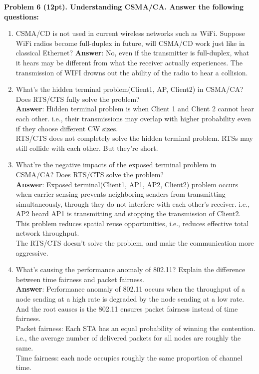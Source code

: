 \documentclass[12pt]{article}
\begin{document}
\noindent \textbf{Problem 6 (12pt). Understanding CSMA/CA. Answer the following questions:\\}
\begin{enumerate}
\item CSMA/CD is not used in current wireless networks such as WiFi. Suppose WiFi radios
become full-duplex in future, will CSMA/CD work just like in classical Ethernet?
\textbf{Answer}: No, even if the transmitter is full-duplex, what it hears may be different from what the receiver actually experiences. The transmission of WIFI drowns out the ability of the radio to hear a collision.

\item What’s the hidden terminal problem(Client1, AP, Client2) in CSMA/CA? Does RTS/CTS fully solve the problem?\\
\textbf{Answer}:  Hidden terminal problem is when Client 1 and Client 2 cannot hear each other. i.e., their transmissions may overlap with higher probability even if they choose different CW sizes.\\ RTS/CTS does not completely solve the hidden terminal problem. RTSs may still collide with each other. But they're short.

\item What’re the negative impacts of the exposed terminal problem in CSMA/CA? Does
RTS/CTS solve the problem?\\
\textbf{Answer}: Exposed terminal(Client1, AP1, AP2, Client2) problem occurs when carrier sensing prevents neighboring senders from transmitting simultaneously, through they do not interfere with each other's receiver. i.e., AP2 heard AP1 is transmitting and stopping the transmission of Client2. This problem reduces spatial reuse opportunities, i.e., reduces effective total network throughput.\\
The RTS/CTS doesn't solve the problem, and make the communication more aggressive.
\item What’s causing the performance anomaly of 802.11? Explain the difference between time
fairness and packet fairness.\\
\textbf{Answer}: Performance anomaly of 802.11 occurs when the throughput of a node sending at a high rate is degraded by the node sending at a low rate. And the root causes is the 802.11 ensures packet fairness instead of time fairness.\\
Packet fairness: Each STA has an equal probability of winning the contention. i.e., the average number of delivered packets for all nodes are roughly the same.\\
Time fairness: each node occupies roughly the same proportion of channel time.

\end{enumerate}
\end{document}
